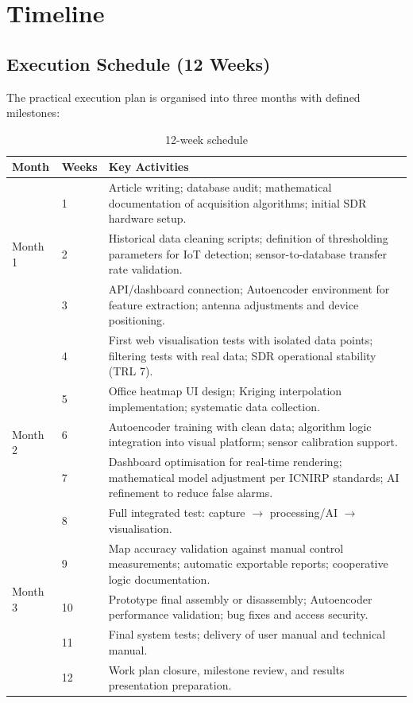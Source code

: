 \documentclass[12pt,a4paper]{article}
\begin{document}
\section{Timeline}

\subsection{Execution Schedule (12 Weeks)}

The practical execution plan is organised into three months with defined milestones:

\begin{table}[H]
\centering
\caption{12-week schedule}
\label{tab:schedule}
\begin{tabular}{@{}p{2.5cm}p{2.5cm}p{9cm}@{}}
\toprule
\textbf{Month} & \textbf{Weeks} & \textbf{Key Activities} \\
\midrule
\multirow{3}{*}{Month 1} & 1 & Article writing; database audit; mathematical documentation of acquisition algorithms; initial SDR hardware setup. \\
& 2 & Historical data cleaning scripts; definition of thresholding parameters for IoT detection; sensor-to-database transfer rate validation. \\
& 3 & API/dashboard connection; Autoencoder environment for feature extraction; antenna adjustments and device positioning. \\
& 4 & First web visualisation tests with isolated data points; filtering tests with real data; SDR operational stability (TRL 7). \\
\midrule
\multirow{3}{*}{Month 2} & 5 & Office heatmap UI design; Kriging interpolation implementation; systematic data collection. \\
& 6 & Autoencoder training with clean data; algorithm logic integration into visual platform; sensor calibration support. \\
& 7 & Dashboard optimisation for real-time rendering; mathematical model adjustment per ICNIRP standards; AI refinement to reduce false alarms. \\
& 8 & Full integrated test: capture $\to$ processing/AI $\to$ visualisation. \\
\midrule
\multirow{3}{*}{Month 3} & 9 & Map accuracy validation against manual control measurements; automatic exportable reports; cooperative logic documentation. \\
& 10 & Prototype final assembly or disassembly; Autoencoder performance validation; bug fixes and access security. \\
& 11 & Final system tests; delivery of user manual and technical manual. \\
& 12 & Work plan closure, milestone review, and results presentation preparation. \\
\bottomrule
\end{tabular}
\end{table}
\end{document}
